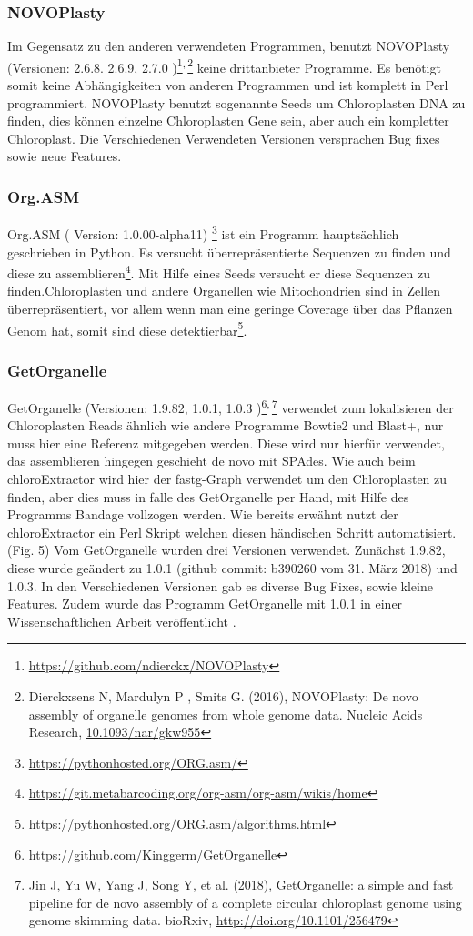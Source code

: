 \documentclass{scrartcl}
\begin{document}
\subsubsection{NOVOPlasty}
\label{sec-2-5-3}
Im Gegensatz zu den anderen verwendeten Programmen, benutzt NOVOPlasty (Versionen: 2.6.8. 2.6.9, 2.7.0 )\footnote{\url{https://github.com/ndierckx/NOVOPlasty}}\textsuperscript{,}\,\footnote{Dierckxsens N, Mardulyn P , Smits G. (2016), NOVOPlasty: De novo assembly of organelle genomes from whole genome data. Nucleic Acids Research, \url{10.1093/nar/gkw955}} keine drittanbieter Programme. Es benötigt somit keine Abhängigkeiten von anderen Programmen
und ist komplett in Perl programmiert. NOVOPlasty benutzt sogenannte Seeds um Chloroplasten DNA zu finden, dies können einzelne Chloroplasten Gene sein, aber auch ein kompletter Chloroplast.
Die Verschiedenen Verwendeten Versionen versprachen Bug fixes sowie neue Features. 
\subsubsection{Org.ASM}
\label{sec-2-5-4}
Org.ASM ( Version: 1.0.00-alpha11) \footnote{\url{https://pythonhosted.org/ORG.asm/}} ist ein Programm hauptsächlich geschrieben in Python. Es versucht überrepräsentierte Sequenzen zu finden und diese zu assemblieren\footnote{\url{https://git.metabarcoding.org/org-asm/org-asm/wikis/home}}. 
Mit Hilfe eines Seeds versucht er diese Sequenzen zu finden.Chloroplasten und andere Organellen wie Mitochondrien sind in Zellen überrepräsentiert, vor allem
wenn man eine geringe Coverage über das Pflanzen Genom hat, somit sind diese detektierbar\footnote{\url{https://pythonhosted.org/ORG.asm/algorithms.html}}.
\subsubsection{GetOrganelle}
\label{sec-2-5-5}
GetOrganelle (Versionen: 1.9.82, 1.0.1, 1.0.3 )\footnote{\url{https://github.com/Kinggerm/GetOrganelle}}\textsuperscript{,}\,\footnote{Jin J, Yu W, Yang J, Song Y, et al. (2018), GetOrganelle: a simple and fast pipeline for de novo assembly of a complete circular chloroplast genome using genome skimming data. bioRxiv, \url{http://doi.org/10.1101/256479}} verwendet zum lokalisieren der Chloroplasten Reads ähnlich wie andere Programme Bowtie2 \footnotemark[18]{} und Blast+, nur muss hier eine Referenz mitgegeben werden. 
Diese wird nur hierfür
verwendet, das assemblieren hingegen geschieht de novo mit SPAdes. Wie auch beim chloroExtractor wird hier der fastg-Graph verwendet um den Chloroplasten zu finden, aber dies muss in falle 
des GetOrganelle per Hand, mit Hilfe des Programms Bandage vollzogen werden. Wie bereits erwähnt nutzt der chloroExtractor ein Perl Skript welchen diesen händischen Schritt automatisiert.(Fig. 5) 
Vom GetOrganelle wurden drei Versionen verwendet. Zunächst 1.9.82, diese wurde geändert zu 1.0.1 (github commit: b390260 vom 31. März 2018) und 1.0.3. In den Verschiedenen Versionen gab es diverse Bug Fixes, sowie
kleine Features.
Zudem wurde das Programm GetOrganelle mit 1.0.1 in einer Wissenschaftlichen Arbeit veröffentlicht \footnotemark[28]{}.
\end{document}
